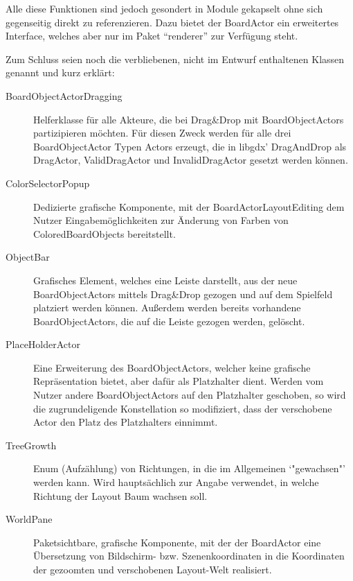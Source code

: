 Alle diese Funktionen sind jedoch gesondert in Module gekapselt ohne sich gegenseitig direkt zu referenzieren.
Dazu bietet der BoardActor ein erweitertes Interface, welches aber nur im Paket "`renderer"' zur Verfügung steht.


Zum Schluss seien noch die verbliebenen, nicht im Entwurf enthaltenen Klassen genannt und kurz erklärt:
\begin{description}
\item[BoardObjectActorDragging]
	Helferklasse für alle Akteure, die bei Drag\&Drop mit BoardObjectActors partizipieren möchten.
	Für diesen Zweck werden für alle drei BoardObjectActor Typen Actors erzeugt, die in libgdx' DragAndDrop als DragActor, ValidDragActor und InvalidDragActor gesetzt werden können.
\item[ColorSelectorPopup]
	Dedizierte grafische Komponente, mit der BoardActorLayoutEditing dem Nutzer Eingabemöglichkeiten zur Änderung von Farben von ColoredBoardObjects bereitstellt.
\item[ObjectBar]
	Grafisches Element, welches eine Leiste darstellt, aus der neue BoardObjectActors mittels Drag\&Drop gezogen und auf dem Spielfeld platziert werden können.
	Außerdem werden bereits vorhandene BoardObjectActors, die auf die Leiste gezogen werden, gelöscht.
\item[PlaceHolderActor]
	Eine Erweiterung des BoardObjectActors, welcher keine grafische Repräsentation bietet, aber dafür als Platzhalter dient.
	Werden vom Nutzer andere BoardObjectActors auf den Platzhalter geschoben, so wird die zugrundeligende Konstellation so modifiziert, dass der verschobene Actor den Platz des Platzhalters einnimmt.
\item[TreeGrowth]
	Enum (Aufzählung) von Richtungen, in die im Allgemeinen `"gewachsen"' werden kann. 
	Wird hauptsächlich zur Angabe verwendet, in welche Richtung der Layout Baum wachsen soll.
\item[WorldPane]
	Paketsichtbare, grafische Komponente, mit der der BoardActor eine Übersetzung von Bildschirm- bzw. Szenenkoordinaten in die Koordinaten der gezoomten und verschobenen Layout-Welt realisiert.
\end{description}
